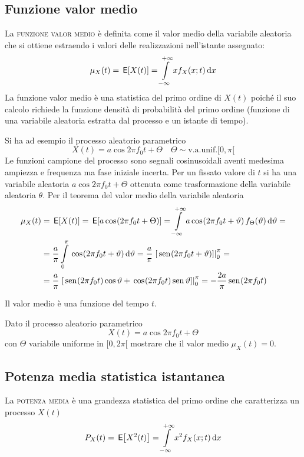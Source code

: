 \subsection{Funzione valor medio}
La \textsc{funzione valor medio} è definita come il valor medio della variabile aleatoria che si ottiene estraendo i valori delle realizzazioni nell'istante assegnato:
\begin{equation}\label{eq:proc_valor_medio}
\mu_X(t)=\,{\operatorname{\mathsf{E}}}\!\left[{X(t)}\right]=\int\limits_{-\infty}^{+\infty}{x f_X(x;t)}{\,\mathop{}\!\mathrm{d}{x}}
\end{equation}
La funzione valor medio è una statistica del primo ordine di $X(t)$ poiché il suo calcolo richiede la funzione densità di probabilità del primo ordine (funzione di una variabile aleatoria estratta dal processo e un istante di tempo).

\begin{esempio}
Si ha ad esempio il processo aleatorio parametrico
\[X(t)=a\cos{2\pi f_0 t+\Theta}\quad\Theta\sim\text{v.a.unif.} [0,\pi[\]
Le funzioni campione del processo sono segnali cosinusoidali aventi medesima ampiezza e frequenza ma fase iniziale incerta. Per un fissato valore di $t$ si ha una variabile aleatoria $a\cos{2\pi f_0 t+\Theta}$ ottenuta come trasformazione della variabile aleatoria $\theta$. 
Per il teorema del valor medio della variabile aleatoria
\begin{equation}\label{eq:esempio_processo_non_stazionario_valor_medio}
\begin{split}\mu_X(t)&=\E{X(t)}=\E{a\cos{2\pi f_0 t+\Theta}}=\intinf{ a\cos{2\pi f_0 t+\theta}f_\Theta(\theta)}{\theta}=\\
&=\frac{a}{\pi}\intd{0}{\pi}{\cos{2\pi f_0 t+\theta}}{\theta}=\frac{a}{\pi}\bound{0}{\pi}{\sen{2\pi f_0 t+\theta}}=\\
&=\frac{a}{\pi}\bound{0}{\pi}{\sen{2\pi f_0 t}\Cos\theta+\cos{2\pi f_0 t}\Sen\theta}=-\frac{2a}{\pi}\sen{2\pi f_0 t}\end{split}\end{equation}

Il valor medio è una funzione del tempo $t$.
\end{esempio}

\begin{esercizio}Dato il processo aleatorio parametrico
\[X(t)=a\cos{2\pi f_0 t+\Theta}\]
con $\Theta$ variabile uniforme in $[0,2\pi[$ mostrare che il valor medio $\mu_X(t)=0$.
\end{esercizio}

\subsection{Potenza media statistica istantanea}
La \textsc{potenza media} è una grandezza statistica del primo ordine che caratterizza un processo $X(t)$
\begin{equation}
P_X(t)=\,{\operatorname{\mathsf{E}}}\!\left[{X^2(t)}\right]=\int\limits_{-\infty}^{+\infty}{x^2 f_X(x;t)}{\,\mathop{}\!\mathrm{d}{x}}
\end{equation}

